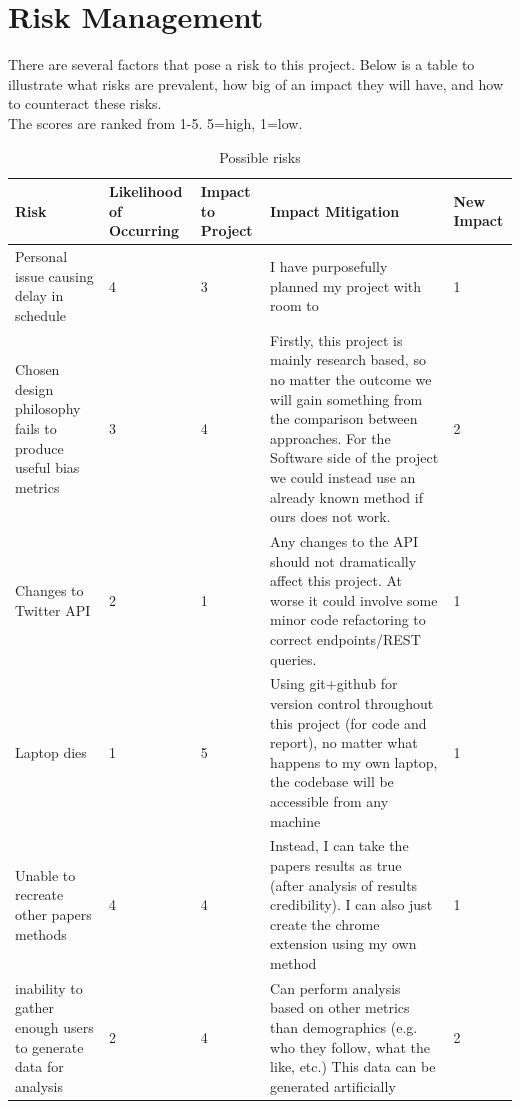 \documentclass[a4paper,fleqn,10pt]{article}
\begin{document}
\section{Risk Management}
\label{sec:risk}
There are several factors that pose a risk to this project. Below is a table to illustrate what risks are prevalent, how big of an impact they will have, and how to counteract these risks.\\
The scores are ranked from 1-5. 5=high, 1=low.
\newpage
\begin{table}[!h]
    \begin{tabular}{|p{25mm}|p{20mm}|p{13mm}|p{55mm}|p{14mm}|}
    \hline
        Risk & Likelihood of Occurring & Impact to Project & Impact Mitigation & New Impact \\
        \hline
        Personal issue causing delay in schedule & 4 & 3 & I have purposefully planned my project with room to & 1 \\
        \hline
        Chosen design philosophy fails to produce useful bias metrics & 3 & 4 & Firstly, this project is mainly research based, so no matter the outcome we will gain something from the comparison between approaches. For the Software side of the project we could instead use an already known method if ours does not work. & 2 \\
        \hline
        Changes to Twitter API & 2 & 1 & Any changes to the API should not dramatically affect this project. At worse it could involve some minor code refactoring to correct endpoints/REST queries. & 1\\
        \hline
        Laptop dies & 1 & 5 & Using git+github for version control throughout this project (for code and report), no matter what happens to my own laptop, the codebase will be accessible from any machine & 1\\
        \hline
        Unable to recreate other papers methods & 4 & 4 & Instead, I can take the papers results as true (after analysis of results credibility). I can also just create the chrome extension using my own method & 1\\
        \hline
        inability to gather enough users to generate data for analysis & 2 & 4 & Can perform analysis based on other metrics than demographics (e.g. who they follow, what the like, etc.) This data can be generated artificially & 2\\
        \hline
    \end{tabular}
    \caption{Possible risks}
    \label{tab:risk}
\end{table}
\newpage
\end{document}
